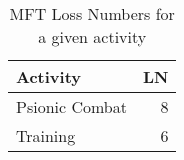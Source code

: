 \begin{table}[h]
\centering
\caption{MFT Loss Numbers for a given activity}
	\begin{tabular}{lr} \hline
	Activity		&	LN	\\ \hline	
	Psionic Combat	&	8	\\
	Training		&	6	\\  \hline
	\end{tabular}
\end{table}
